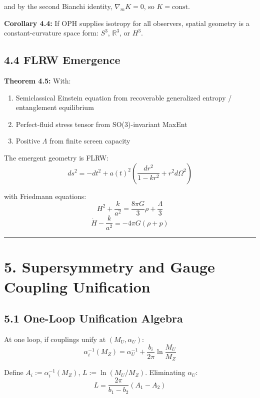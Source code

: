 and by the second Bianchi identity, \(\nabla_m K = 0\), so \(K = \text{const}\).

\textbf{Corollary 4.4:} If OPH supplies isotropy for all observers, spatial geometry is a constant-curvature space form: \(S^3\), \(\mathbb{R}^3\), or \(H^3\).

\subsection{4.4 FLRW Emergence}\label{44-flrw-emergence}

\textbf{Theorem 4.5:} With:

\begin{enumerate}
\def\labelenumi{\arabic{enumi}.}
\tightlist
\item
  Semiclassical Einstein equation from recoverable generalized entropy / entanglement equilibrium
\item
  Perfect-fluid stress tensor from SO(3)-invariant MaxEnt
\item
  Positive \(\Lambda\) from finite screen capacity
\end{enumerate}

The emergent geometry is FLRW: \[ds^2 = -dt^2 + a(t)^2 \left(\frac{dr^2}{1-kr^2} + r^2 d\Omega^2\right)\]

with Friedmann equations: \[H^2 + \frac{k}{a^2} = \frac{8\pi G}{3}\rho + \frac{\Lambda}{3}\] \[\dot{H} - \frac{k}{a^2} = -4\pi G(\rho + p)\]

\begin{center}\rule{0.5\linewidth}{0.5pt}\end{center}

\section{5. Supersymmetry and Gauge Coupling Unification}\label{5-supersymmetry-and-gauge-coupling-unification}

\subsection{5.1 One-Loop Unification Algebra}\label{51-one-loop-unification-algebra}

At one loop, if couplings unify at \((M_U, \alpha_U)\): \[\alpha_i^{-1}(M_Z) = \alpha_U^{-1} + \frac{b_i}{2\pi}\ln\frac{M_U}{M_Z}\]

Define \(A_i := \alpha_i^{-1}(M_Z)\), \(L := \ln(M_U/M_Z)\). Eliminating \(\alpha_U\): \[L = \frac{2\pi}{b_1 - b_2}(A_1 - A_2)\]

